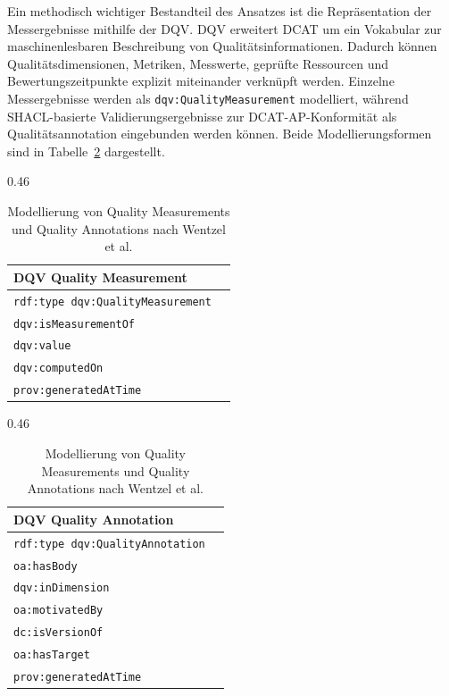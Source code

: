 Ein methodisch wichtiger Bestandteil des Ansatzes ist die Repräsentation der Messergebnisse mithilfe der \acrfull{DQV}. DQV erweitert DCAT um ein Vokabular zur maschinenlesbaren Beschreibung von Qualitätsinformationen. Dadurch können Qualitätsdimensionen, Metriken, Messwerte, geprüfte Ressourcen und Bewertungszeitpunkte explizit miteinander verknüpft werden. Einzelne Messergebnisse werden als \texttt{dqv:QualityMeasurement} modelliert, während SHACL-basierte Validierungsergebnisse zur DCAT-AP-Konformität als Qualitätsannotation eingebunden werden können. \cite{wentzel2023extensive}
Beide Modellierungsformen sind in Tabelle~\ref{tab:piveau_dqv_model} dargestellt.
\begin{table}[h!]
\centering
\tiny
\renewcommand{\arraystretch}{1.2}

\begin{subtable}[t]{0.46\textwidth}
\
\centering
\caption{Quality Measurement}
\label{tab:piveau_quality_measurement}
\begin{tabular}{ll}
\toprule
\textbf{DQV Quality Measurement} \\
\midrule
\texttt{rdf:type  dqv:QualityMeasurement} \\
\texttt{dqv:isMeasurementOf} \\
\texttt{dqv:value} \\
\texttt{dqv:computedOn} \\
\texttt{prov:generatedAtTime} \\
\bottomrule
\end{tabular}
\end{subtable}
\hfill
\begin{subtable}[t]{0.46\textwidth}
\centering
\caption{Quality Annotation}
\label{tab:piveau_quality_annotation}
\begin{tabular}{ll}
\toprule
\textbf{DQV Quality Annotation} \\
\midrule
\texttt{rdf:type  dqv:QualityAnnotation} \\
\texttt{oa:hasBody} \\
\texttt{dqv:inDimension} \\
\texttt{oa:motivatedBy} \\
\texttt{dc:isVersionOf} \\
\texttt{oa:hasTarget} \\
\texttt{prov:generatedAtTime} \\
\bottomrule
\end{tabular}
\end{subtable}
\caption[Modellierung von Quality Measurements und Quality Annotations nach Wentzel et al.]{Modellierung von Quality Measurements und Quality Annotations nach Wentzel et al. \cite{wentzel2023extensive}}
\label{tab:piveau_dqv_model}
\end{table}

